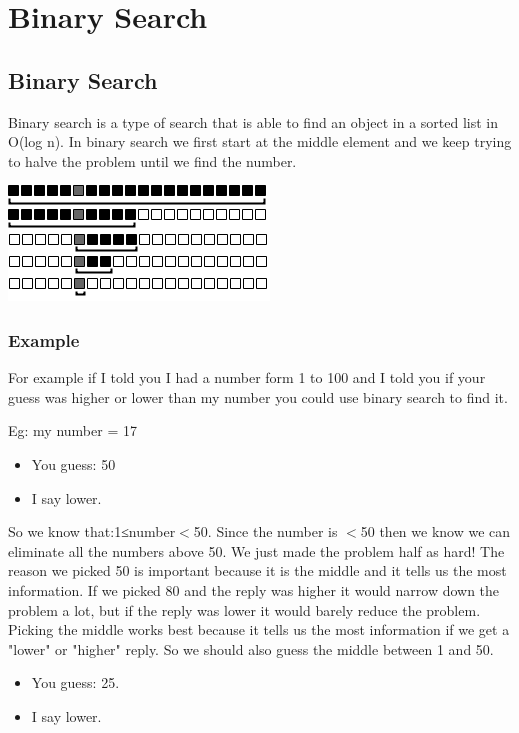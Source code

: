 \documentclass[11pt,oneside]{book}
\makeatletter
\def\maxwidth#1{\ifdim\Gin@nat@width>#1 #1\else\Gin@nat@width\fi}
\makeatother
\begin{document}
        \section{ Binary Search }
        \subsection{Binary Search}

Binary search is a type of search that is able to find an object in a sorted list in O(log n). In binary search we first start at the middle element and we keep trying to halve the problem until we find the number.

\includegraphics[width=\maxwidth{\textwidth}]{binarysearch.png}

\subsubsection{Example}

For example if I told you I had a number form 1 to 100 and I told you if your guess was higher or lower than my number you could use binary search to find it.

Eg: my number = 17

\begin{itemize}
\item You guess: 50
\item I say lower.
\end{itemize}

So we know that:1≤number$<$50. Since the number is $<$50 then we know we can eliminate all the numbers above 50. We just made the problem half as hard! The reason we picked 50 is important because it is the middle and it tells us the most information. If we picked 80 and the reply was higher it would narrow down the problem a lot, but if the reply was lower it would barely reduce the problem. Picking the middle works best because it tells us the most information if we get a "lower" or "higher" reply. So we should also guess the middle between 1 and 50.

\begin{itemize}
\item You guess: 25.
\item I say lower.
\end{itemize}
\end{document}
